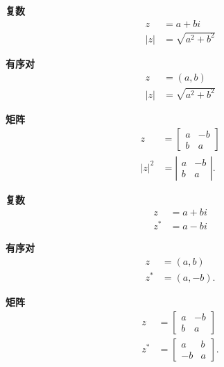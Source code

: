 \begin{tcolorbox}[breakable, enhanced, title = {范数}]
  \textbf{复数}
  $$
    \begin{aligned}
      z   & =a+b i              \\
      |z| & =\sqrt{a^{2}+b^{2}}
    \end{aligned}
  $$

  \textbf{有序对}
  $$
    \begin{aligned}
      z   & =(a, b)             \\
      |z| & =\sqrt{a^{2}+b^{2}}
    \end{aligned}
  $$

  \textbf{矩阵}
  $$
    \begin{aligned}
      z       & =\left[\begin{array}{cc}
          a & -b \\
          b & a
        \end{array}\right]   \\
      |z|^{2} & =\left|\begin{array}{cc}
        a & -b \\
        b & a
      \end{array}\right| .
    \end{aligned}
  $$
\end{tcolorbox}

\begin{tcolorbox}[breakable, enhanced, title = {复共轭}]
  \textbf{复数}
  $$
    \begin{aligned}
      z     & =a+b i \\
      z^{*} & =a-b i
    \end{aligned}
  $$

  \textbf{有序对}
  $$
    \begin{aligned}
      z     & =(a, b)   \\
      z^{*} & =(a,-b) .
    \end{aligned}
  $$

  \textbf{矩阵}
  $$
    \begin{aligned}
      z     & =\left[\begin{array}{cc}
          a & -b \\
          b & a
        \end{array}\right]   \\
      z^{*} & =\left[\begin{array}{cc}
          a  & b \\
          -b & a
        \end{array}\right] .
    \end{aligned}
  $$
\end{tcolorbox}

